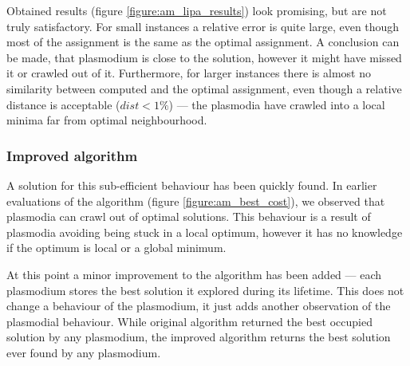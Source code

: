 \documentclass[english,a4paper,twoside]{ppfcmthesis}
\begin{document}
Obtained results (figure \ref{figure:am_lipa_results}) look promising, but are not truly satisfactory. For small instances a relative error is quite large, even though most of the assignment is the same as the optimal assignment. A conclusion can be made, that plasmodium is close to the solution, however it might have missed it or crawled out of it. Furthermore, for larger instances there is almost no similarity between computed and the optimal assignment, even though a relative distance is acceptable ($dist < 1\%$) --- the plasmodia have crawled into a local minima far from optimal neighbourhood.

\subsubsection{Improved algorithm}

A solution for this sub-efficient behaviour has been quickly found. In earlier evaluations of the algorithm (figure \ref{figure:am_best_cost}), we observed that plasmodia can crawl out of optimal solutions. This behaviour is a result of plasmodia avoiding being stuck in a local optimum, however it has no knowledge if the optimum is local or a global minimum.

At this point a minor improvement to the algorithm has been added --- each plasmodium stores the best solution it explored during its lifetime. This does not change a behaviour of the plasmodium, it just adds another observation of the plasmodial behaviour. While original algorithm returned the best occupied solution by any plasmodium, the improved algorithm returns the best solution ever found by any plasmodium.
\end{document}
